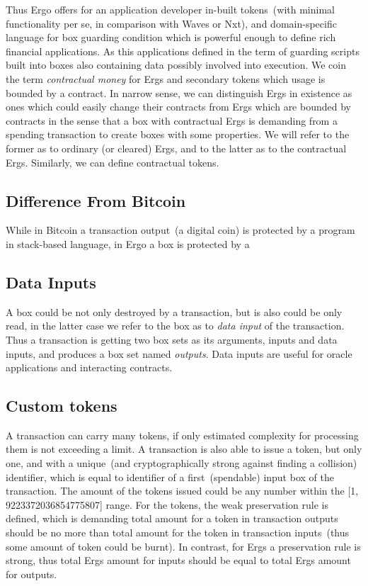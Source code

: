  Thus Ergo offers for an application developer in-built tokens~(with minimal functionality per se, in comparison with
 Waves or Nxt), and domain-specific language for box guarding condition which is powerful enough to define rich
 financial applications. As this applications defined in the term of guarding scripts built into boxes also containing
 data possibly involved into execution. We coin the term {\em contractual money} for Ergs and secondary tokens which
 usage is bounded by a contract. In narrow sense, we can distinguish Ergs in existence as ones which could easily
 change their contracts from Ergs which are bounded by contracts in the sense that a box with contractual Ergs is
 demanding from a spending transaction to create boxes with some properties. We will refer to the former as to ordinary
 (or cleared) Ergs, and to the latter as to the contractual Ergs. Similarly, we can define contractual tokens.

\subsection{Difference From Bitcoin}

 While in Bitcoin a transaction output~(a digital coin) is protected by a program in stack-based language, in Ergo a
 box is protected by a


\subsection{Data Inputs}

 A box could be not only destroyed by a transaction, but is also could be only read, in the latter case we refer to the
 box as to {\em data input} of the transaction. Thus a transaction is getting two box sets as its arguments, inputs and
 data inputs, and produces a box set named {\em outputs}. Data inputs are useful for oracle applications and interacting
 contracts.

\subsection{Custom tokens}

 A transaction can carry many tokens, if only estimated complexity for processing them is not exceeding a limit. A
 transaction is also able to issue a token, but only one, and with a unique~(and cryptographically strong against
 finding a collision) identifier, which is equal to identifier of a first~(spendable) input box of the transaction.
 The amount of the tokens issued could be any number within the [1, 9223372036854775807] range. For the tokens, the weak
 preservation rule is defined, which is demanding total amount for a token in transaction outputs should be no more
 than total amount for the token in transaction inputs~(thus some amount of token could be burnt). In contrast, for Ergs
 a preservation rule is strong, thus total Ergs amount for inputs should be equal to total Ergs amount for outputs.


